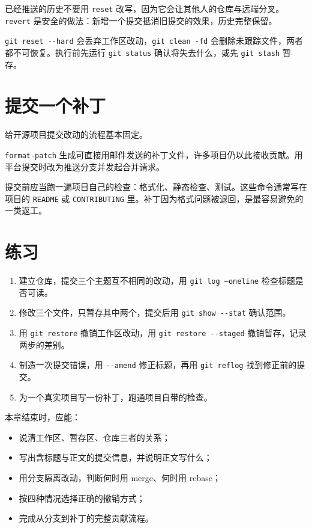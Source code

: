 已经推送的历史不要用 \texttt{reset} 改写，因为它会让其他人的仓库与远端分叉。\texttt{revert} 是安全的做法：新增一个提交抵消旧提交的效果，历史完整保留。

\begin{warnbox}[危险命令]
\texttt{git reset -{}-hard} 会丢弃工作区改动，\texttt{git clean -fd} 会删除未跟踪文件，两者都不可恢复。执行前先运行 \texttt{git status} 确认将失去什么，或先 \texttt{git stash} 暂存。
\end{warnbox}

\section{提交一个补丁}

给开源项目提交改动的流程基本固定。


\texttt{format-patch} 生成可直接用邮件发送的补丁文件，许多项目仍以此接收贡献。用平台提交时改为推送分支并发起合并请求。

提交前应当跑一遍项目自己的检查：格式化、静态检查、测试。这些命令通常写在项目的 \texttt{README} 或 \texttt{CONTRIBUTING} 里。补丁因为格式问题被退回，是最容易避免的一类返工。

\section{练习}

\begin{enumerate}
  \item 建立仓库，提交三个主题互不相同的改动，用 \texttt{git log --oneline} 检查标题是否可读。
  \item 修改三个文件，只暂存其中两个，提交后用 \texttt{git show -{}-stat} 确认范围。
  \item 用 \texttt{git restore} 撤销工作区改动，用 \texttt{git restore -{}-staged} 撤销暂存，记录两步的差别。
  \item 制造一次提交错误，用 \texttt{-{}-amend} 修正标题，再用 \texttt{git reflog} 找到修正前的提交。
  \item 为一个真实项目写一份补丁，跑通项目自带的检查。
\end{enumerate}

\begin{checkpoint}
本章结束时，应能：
\begin{itemize}
  \item 说清工作区、暂存区、仓库三者的关系；
  \item 写出含标题与正文的提交信息，并说明正文写什么；
  \item 用分支隔离改动，判断何时用 merge、何时用 rebase；
  \item 按四种情况选择正确的撤销方式；
  \item 完成从分支到补丁的完整贡献流程。
\end{itemize}
\end{checkpoint}
